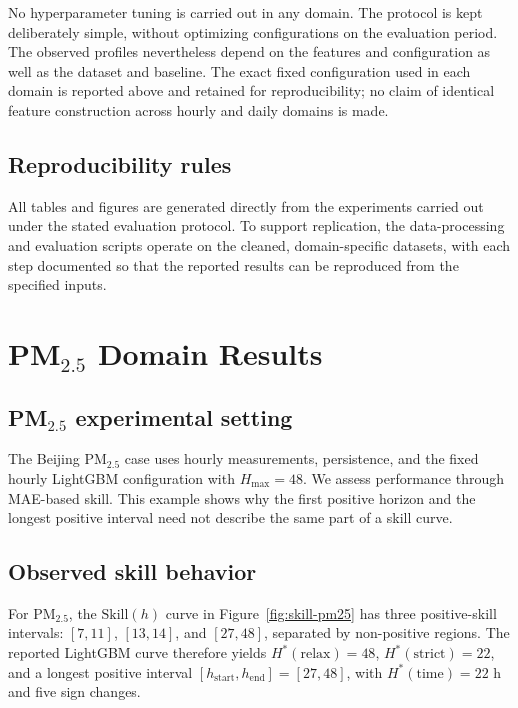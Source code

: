 \documentclass[pdflatex]{sn-jnl}
\begin{document}


No hyperparameter tuning is carried out in any domain. The protocol is
kept deliberately simple, without optimizing configurations on the
evaluation period. The observed profiles nevertheless depend on the
features and configuration as well as the dataset and baseline. The exact fixed configuration used in each domain is reported
above and retained for reproducibility; no claim of identical feature
construction across hourly and daily domains is made.

\subsection{Reproducibility rules}

All tables and figures are generated directly from the experiments
carried out under the stated evaluation protocol. To support
replication, the data-processing and evaluation scripts operate on the
cleaned, domain-specific datasets, with each step documented so that
the reported results can be reproduced from the specified inputs.


\section{PM$_{2.5}$ Domain Results}

\subsection{\texorpdfstring{PM$_{2.5}$}{PM2.5} experimental setting}

The Beijing PM$_{2.5}$ case \citep{chen2015beijingpm25} uses hourly measurements, persistence, and the fixed hourly LightGBM configuration with $H_{\max}=48$. We assess performance through MAE-based skill. This example shows why the first positive horizon and the longest positive interval need not describe the same part of a skill curve.

\subsection{Observed skill behavior}
For PM$_{2.5}$, the $\mathrm{Skill}(h)$ curve in
Figure~\ref{fig:skill-pm25} has three positive-skill intervals:
$[7,11]$, $[13,14]$, and $[27,48]$, separated by non-positive regions.
The reported LightGBM curve therefore yields
$H^*(\mathrm{relax}) = 48$, $H^*(\mathrm{strict}) = 22$, and a longest
positive interval $[h_{\mathrm{start}},h_{\mathrm{end}}] = [27,48]$,
with $H^*(\mathrm{time}) = 22$ h and five sign changes.
\end{document}
